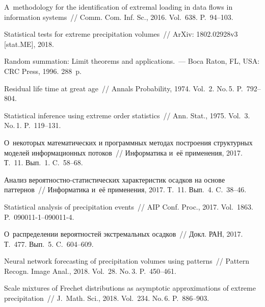 \begin{multicols}{2}
{{\begin{thebibliography}{99}
A~methodology for the identification of extremal loading in data flows in 
information systems~// Comm. Com. Inf. Sc., 2016. Vol.~638. P.~94--103.

Statistical tests for extreme precipitation volumes~// \mbox{ArXiv}:\linebreak
1802.02928v3 [stat.ME],  2018.

Random summation: Limit theorems and applications.~--- 
Boca Raton, FL, USA: CRC Press, 1996. 288~p.

Residual life time at great age~// Annals Probability, 1974. Vol.~2. No.\,5.
P.~792--804.

Statistical inference using extreme order statistics~// 
Ann. Stat., 1975. Vol.~3. No.\,1. P.~119--131.

 О~некоторых математических
и программных методах построения структурных моделей информационных
потоков~// Информатика и~её применения, 2017. Т.~11. Вып.~1. C.~58--68.

Анализ ве\-ро\-ят\-но\-ст\-но-ста\-ти\-сти\-че\-ских характеристик осадков на 
основе паттернов~// Информатика и~её применения, 2017. Т.~11. Вып.~4. C.~38--46.

 Statistical analysis of precipitation events~// AIP
Conf. Proc., 2017. Vol.~1863. P.~\mbox{090011-1}--\mbox{090011-4}.

О~распределении вероятностей экстремальных осадков~// Докл. РАН,
2017. Т.~477. Вып.~5. C.~604--609.

 Neural
network forecasting of precipitation volumes using patterns~// Pattern 
Recogn. Image
Anal., 2018. Vol.~28. No.\,3. P.~450--461.

 Scale mixtures of
Frechet distributions as asymptotic approximations of extreme precipitation~// 
J.~Math. Sci., 2018. Vol.~234. No.\,6. P.~886--903.
 \end{thebibliography}

 }
 }

\end{multicols}

